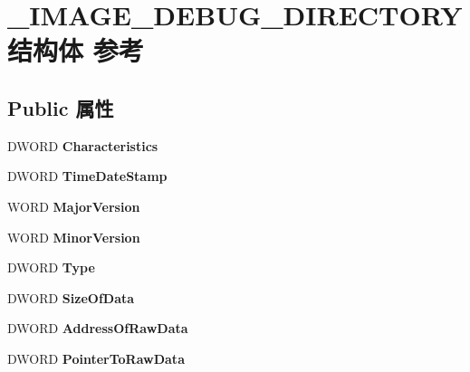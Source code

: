 \hypertarget{struct___i_m_a_g_e___d_e_b_u_g___d_i_r_e_c_t_o_r_y}{}\section{\+\_\+\+I\+M\+A\+G\+E\+\_\+\+D\+E\+B\+U\+G\+\_\+\+D\+I\+R\+E\+C\+T\+O\+R\+Y结构体 参考}
\label{struct___i_m_a_g_e___d_e_b_u_g___d_i_r_e_c_t_o_r_y}
\subsection*{Public 属性}
\begin{DoxyCompactItemize}
\item 
\mbox{\label{struct___i_m_a_g_e___d_e_b_u_g___d_i_r_e_c_t_o_r_y_ae1002c6ca09af66324a5107f7a73f003}} 
D\+W\+O\+RD {\bfseries Characteristics}
\item 
\mbox{\label{struct___i_m_a_g_e___d_e_b_u_g___d_i_r_e_c_t_o_r_y_a4e68e860ab7a90294ac4ab51e88a22be}} 
D\+W\+O\+RD {\bfseries Time\+Date\+Stamp}
\item 
\mbox{\label{struct___i_m_a_g_e___d_e_b_u_g___d_i_r_e_c_t_o_r_y_ab50495b57830738fd9d52f10a3262049}} 
W\+O\+RD {\bfseries Major\+Version}
\item 
\mbox{\label{struct___i_m_a_g_e___d_e_b_u_g___d_i_r_e_c_t_o_r_y_a9ca861e90699d105a11ad4d1d579df37}} 
W\+O\+RD {\bfseries Minor\+Version}
\item 
\mbox{\label{struct___i_m_a_g_e___d_e_b_u_g___d_i_r_e_c_t_o_r_y_a40ebc596f22e44c72b7120e556c51f9d}} 
D\+W\+O\+RD {\bfseries Type}
\item 
\mbox{\label{struct___i_m_a_g_e___d_e_b_u_g___d_i_r_e_c_t_o_r_y_a234d4ada7b763b0c171a8a3a4f5ac29e}} 
D\+W\+O\+RD {\bfseries Size\+Of\+Data}
\item 
\mbox{\label{struct___i_m_a_g_e___d_e_b_u_g___d_i_r_e_c_t_o_r_y_a8f2bc626907c502797013c7271a9566f}} 
D\+W\+O\+RD {\bfseries Address\+Of\+Raw\+Data}
\item 
\mbox{\label{struct___i_m_a_g_e___d_e_b_u_g___d_i_r_e_c_t_o_r_y_ae36dd1275f9316df118e3d9929eff84c}} 
D\+W\+O\+RD {\bfseries Pointer\+To\+Raw\+Data}
\end{DoxyCompactItemize}


